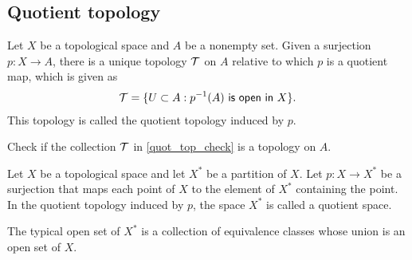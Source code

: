 \subsection{Quotient topology}

\begin{defi}
    Let $X$ be a topological space and $A$ be a nonempty set.
    Given a surjection $p: X\rightarrow A$, there is a unique topology ${\mathcal{T}}$ on $A$ relative to which $p$ is a quotient map, which is given as
    \begin{align}\label{quot_top_check}
        {\mathcal{T}}=\{U\subset A: p^{-1}(A)\textsf{ is open in }X\}.
    \end{align}
    This topology is called the quotient topology induced by $p$.
\end{defi}
\begin{prob}
    Check if the collection ${\mathcal{T}}$ in \cref{quot_top_check} is a topology on $A$.
\end{prob}
\begin{defi}
    Let $X$ be a topological space and let $X^*$ be a partition of $X$.
    Let $p: X\rightarrow X^*$ be a surjection that maps each point of $X$ to the element of $X^*$ containing the point.
    In the quotient topology induced by $p$, the space $X^*$ is called a quotient space.
\end{defi}
\begin{rmk}
    The typical open set of $X^*$ is a collection of equivalence classes whose union is an open set of $X$.
\end{rmk}

